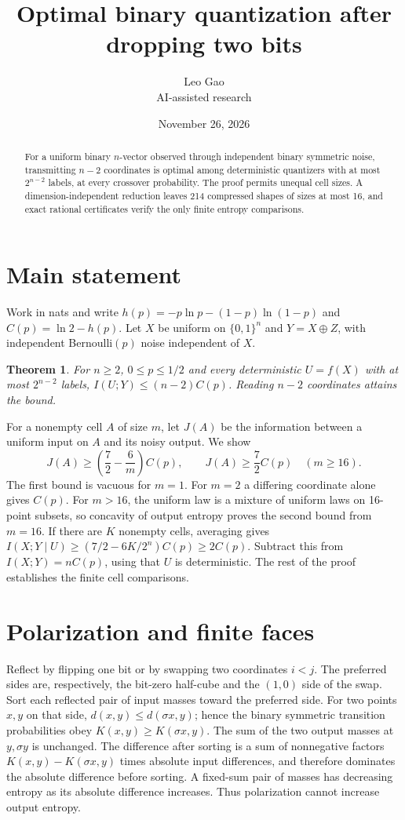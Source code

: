 \documentclass[11pt]{article}
\title{Optimal binary quantization after dropping two bits}
\author{Leo Gao\\\small AI-assisted research}
\date{November 26, 2026}
\newtheorem{theorem}{Theorem}
\begin{document}
\maketitle
\begin{abstract}
For a uniform binary $n$-vector observed through independent binary symmetric
noise, transmitting $n-2$ coordinates is optimal among deterministic
quantizers with at most $2^{n-2}$ labels, at every crossover probability.
The proof permits unequal cell sizes. A dimension-independent reduction
leaves 214 compressed shapes of sizes at most 16, and exact rational
certificates verify the only finite entropy comparisons.
\end{abstract}

\section{Main statement}
Work in nats and write $h(p)=-p\ln p-(1-p)\ln(1-p)$ and
$C(p)=\ln 2-h(p)$. Let $X$ be uniform on $\{0,1\}^n$ and
$Y=X\oplus Z$, with independent Bernoulli$(p)$ noise independent of $X$.
\begin{theorem}
For $n\ge2$, $0\le p\le1/2$ and every deterministic $U=f(X)$ with at
most $2^{n-2}$ labels, $I(U;Y)\le(n-2)C(p)$. Reading $n-2$ coordinates
attains the bound.
\end{theorem}
For a nonempty cell $A$ of size $m$, let $J(A)$ be the information between a
uniform input on $A$ and its noisy output. We show
\[
 J(A)\ge\left(\frac72-\frac6m\right)C(p),
 \qquad J(A)\ge\frac72 C(p)\quad(m\ge16).
\]
The first bound is vacuous for $m=1$. For $m=2$ a differing coordinate alone
gives $C(p)$. For $m>16$, the uniform law is a mixture of uniform laws on
16-point subsets, so concavity of output entropy proves the second bound
from $m=16$. If there are $K$ nonempty cells, averaging gives
$I(X;Y\mid U)\ge (7/2-6K/2^n)C(p)\ge2C(p)$. Subtract this from
$I(X;Y)=nC(p)$, using that $U$ is deterministic. The rest of the proof
establishes the finite cell comparisons.

\section{Polarization and finite faces}
Reflect by flipping one bit or by swapping two coordinates $i<j$. The
preferred sides are, respectively, the bit-zero half-cube and the $(1,0)$
side of the swap. Sort each reflected pair of input masses toward the
preferred side. For two points $x,y$ on that side,
$d(x,y)\le d(\sigma x,y)$; hence the binary symmetric transition
probabilities obey $K(x,y)\ge K(\sigma x,y)$. The sum of the two output
masses at $y,\sigma y$ is unchanged. The difference after sorting is a sum
of nonnegative factors $K(x,y)-K(\sigma x,y)$ times absolute input
differences, and therefore dominates the absolute difference before sorting.
A fixed-sum pair of masses has decreasing entropy as its absolute difference
increases. Thus polarization cannot increase output entropy.
\end{document}

